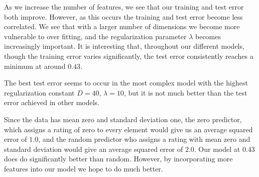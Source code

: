 \documentclass[12pt]{article}
\begin{document}
As we increase the number of features, we see that our training and test error both improve. However, as this occurs the training and test error become less correlated. We see that with a larger number of dimensions we become more vulnerable to over fitting, and the regularization parameter $\lambda$ becomes increasingly important. It is interesting that, throughout our different models, though the training error varies significantly, the test error consistently reaches a minimum at around $0.43$. 

The best test error seems to occur in the most complex model with the highest regularization constant $D=40$, $\lambda = 10$, but it is not much better than the test error achieved in other models.

Since the data has mean zero and standard deviation one, the zero predictor, which assigns a rating of zero to every element would give us an average squared error of $1.0$, and the random predictor who assigns a rating with mean zero and standard deviation would give an average squared error of $2.0$. Our model at $0.43$ does do significantly better than random. However, by incorporating more features into our model we hope to do much better.
\end{document}
